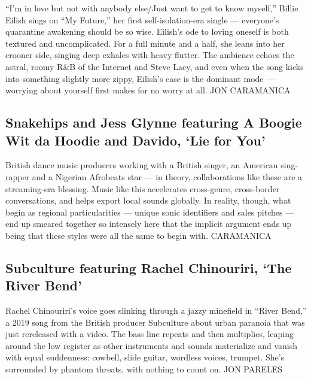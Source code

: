 ``I'm in love but not with anybody else/Just want to get to know
myself,'' Billie Eilish sings on ``My Future,'' her first
self-isolation-era single --- everyone's quarantine awakening should be
so wise. Eilish's ode to loving oneself is both textured and
uncomplicated. For a full minute and a half, she leans into her crooner
side, singing deep exhales with heavy flutter. The ambience echoes the
astral, roomy R\&B of the Internet and Steve Lacy, and even when the
song kicks into something slightly more zippy, Eilish's ease is the
dominant mode --- worrying about yourself first makes for no worry at
all. JON CARAMANICA

\hypertarget{snakehips-and-jess-glynne-featuring-a-boogie-wit-da-hoodie-and-davido-lie-for-you}{%
\subsection{Snakehips and Jess Glynne featuring A Boogie Wit da Hoodie
and Davido, `Lie for
You'}\label{snakehips-and-jess-glynne-featuring-a-boogie-wit-da-hoodie-and-davido-lie-for-you}}

British dance music producers working with a British singer, an American
sing-rapper and a Nigerian Afrobeats star --- in theory, collaborations
like these are a streaming-era blessing. Music like this accelerates
cross-genre, cross-border conversations, and helps export local sounds
globally. In reality, though, what begin as regional particularities ---
unique sonic identifiers and sales pitches --- end up smeared together
so intensely here that the implicit argument ends up being that these
styles were all the same to begin with. CARAMANICA

\hypertarget{subculture-featuring-rachel-chinouriri-the-river-bend}{%
\subsection{Subculture featuring Rachel Chinouriri, `The River
Bend'}\label{subculture-featuring-rachel-chinouriri-the-river-bend}}

Rachel Chinouriri's voice goes slinking through a jazzy minefield in
``River Bend,'' a 2019 song from the British producer Subculture about
urban paranoia that was just rereleased with a video. The bass line
repeats and then multiplies, leaping around the low register as other
instruments and sounds materialize and vanish with equal suddenness:
cowbell, slide guitar, wordless voices, trumpet. She's surrounded by
phantom threats, with nothing to count on. JON PARELES

